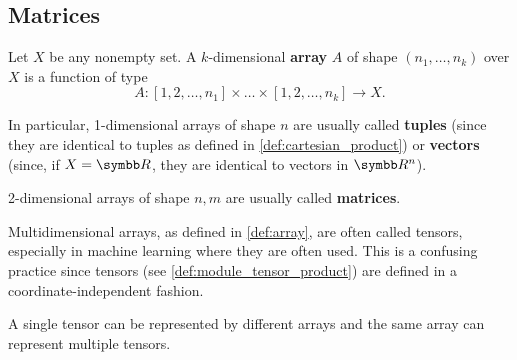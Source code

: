 \subsection{Matrices}\label{subsec:matrices}

\begin{definition}\label{def:array}
  Let \( X \) be any nonempty set. A \( k \)-dimensional \textbf{array} \( A \) of shape \( (n_1, \ldots, n_k) \) over \( X \) is a function of type
  \begin{equation*}
    A: [1, 2, \ldots, n_1] \times \ldots \times [1, 2, \ldots, n_k] \to X.
  \end{equation*}

  In particular, 1-dimensional arrays of shape \( n \) are usually called \textbf{tuples} (since they are identical to tuples as defined in \cref{def:cartesian_product}) or \textbf{vectors} (since, if \( X = \BB{R} \), they are identical to vectors in \( \BB{R}^n \)).

  2-dimensional arrays of shape \( n, m \) are usually called \textbf{matrices}.
\end{definition}

\begin{remark}\label{remark:arrays_vs_tensors}
  Multidimensional arrays, as defined in \cref{def:array}, are often called tensors, especially in machine learning where they are often used. This is a confusing practice since tensors (see \cref{def:module_tensor_product}) are defined in a coordinate-independent fashion.

  A single tensor can be represented by different arrays and the same array can represent multiple tensors.
\end{remark}
